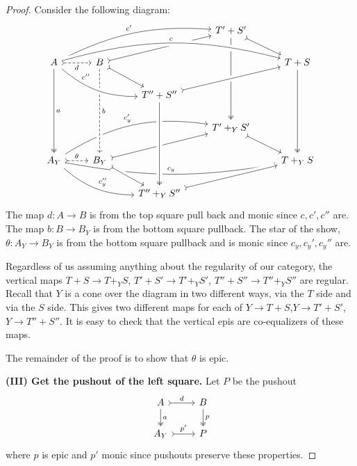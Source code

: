 \documentclass[12pt]{article}
\newcommand{\from}{\colon}
\renewcommand{\(}{\left(}
\renewcommand{\)}{\right)}
\renewcommand{\{}{\left\lbrace}
\renewcommand{\}}{\right\rbrace}
\theoremstyle{remark}
\theoremstyle{definition}
\begin{document}
\begin{proof}
		Consider the following diagram:
		\[
		\begin{tikzcd}
		{} &
		{} &
		{} &
		{T'+S'} 
		\ar[rd,rightarrowtail]
		\ar[ddd,twoheadrightarrow]&
		{} \\
		{A} 
		\ar[ddd,twoheadrightarrow,"a"]  
		\ar[rrru,bend left=15,"c'"] &
		{B} 
		\ar[urr,rightarrowtail]
		\ar[dr,rightarrowtail] &
		{} &
		{} &
		{T+S} 
		\ar[ddd,twoheadrightarrow]\\
		{} &
		{} &
		{T''+S''} &
		{} &
		{} \\
		{} &
		{} &
		{} &
		{T'+_YS'} 
		\ar[dr,rightarrowtail]&
		{} \\
		{A_Y} 
		\ar[rrru,bend left=20,"c'_y"] 
		\ar[r,rightarrowtail, dashed,"\theta"]
		\ar[rrd,bend right=20,"c''_y"] &
		{B_Y} 
		\ar[rru,rightarrowtail] &
		{} &
		{} &
		{T+_YS} \\
		{} &
		{} &
		{T''+_YS''} &
		{} &
		{}
		\ar[from=2-2,to=5-2,crossing over,dashed,"b"]
		\ar[from=2-1,to=3-3,crossing over, bend right=20,  "c''" near start]
		\ar[from=3-3,to=2-5,crossing over,rightarrowtail]
		\ar[from=2-1,to=2-5,crossing over,bend left=15,"c"]
		\ar[from=5-1,to=5-5,bend right=10,"c_y"]
		\ar[from=3-3,to=6-3,crossing over,twoheadrightarrow]
		\ar[from=5-2,to=6-3,crossing over,rightarrowtail]
		\ar[from=6-3,to=5-5,crossing over,rightarrowtail]
		\ar[from=2-1,to=2-2,rightarrowtail,dashed,swap,"d"]
		\end{tikzcd}
		\]
		The map $d \from A \to B$ is from the top square pull back and monic since $c,c',c''$ are. The map $b \from B \to B_Y$ is from the bottom square pullback.  The star of the show, $\theta \from A_Y \to B_Y$ is from the bottom square pullback and is monic since $c_y,c_y',c_y''$ are.  
		
		Regardless of us assuming anything about the regularity of our category, the vertical maps $T+S \to T+_YS$, $T'+S' \to T'+_YS'$, $T''+S'' \to T''+_YS''$ are regular.  Recall that $Y$ is a cone over the diagram in two different ways, via the $T$ side and via the $S$ side. This gives two different maps for each of $Y \to T+S$,$Y \to T'+S'$,$Y \to T''+S''$.  It is easy to check that the vertical epis are co-equalizers of these maps.  
		
		The remainder of the proof is to show that $\theta$ is epic.
		
		\textbf{(III) Get the pushout of the left square.} Let $P$ be the pushout
		\[
		\begin{tikzcd}
		{A} 
		\ar[r,rightarrowtail,"d"]
		\ar[d,twoheadrightarrow,"a"] &
		{B} \ar[d,twoheadrightarrow,"p"] \\
		{A_Y} \ar[r,rightarrowtail, "p'"] &
		{P} 
		\end{tikzcd}
		\] 
		where $p$ is epic and $p'$ monic since pushouts preserve these properties.
		

\end{proof}
\end{document}
